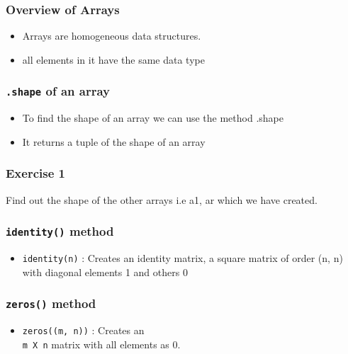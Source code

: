 \documentclass[17pt]{beamer}
\begin{document}
\begin{frame}
\frametitle{Overview of Arrays}

\begin{itemize}
\item Arrays are homogeneous data structures.\pause
\item all elements in it have the same data type
\end{itemize}
\end{frame}
\begin{frame}[fragile]
\frametitle{\verb~.shape~ of an array}

\begin{itemize}
\item To find the shape of an array we can use the method .shape\pause

\item It returns a tuple of the shape of an array
\end{itemize}
\end{frame}
\begin{frame}
\frametitle{Exercise 1}

  Find out the shape of the other arrays i.e a1, ar which we have created.
\end{frame}
\begin{frame}
\frametitle{\texttt{identity()} method}

\begin{itemize}
\item \texttt{identity(n)} :
    Creates an identity matrix, a square matrix of order (n, n) with diagonal elements 1 and others 0
\end{itemize}
\end{frame}
\begin{frame}
\frametitle{\texttt{zeros()} method}


\begin{itemize}
\item \texttt{zeros((m, n))} :
    Creates an \\\texttt{m X n} matrix with all elements as 0.
\end{itemize}
\end{frame}
\end{document}
